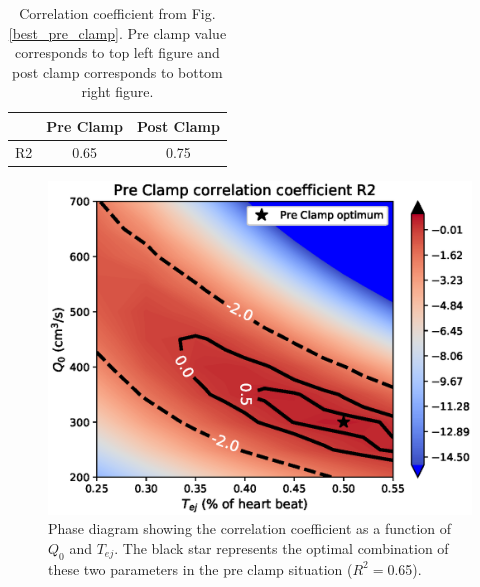 \documentclass{config}
\begin{document}
\begin{table}[H]
\begin{center}
\begin{tabular}{|c|c|c|}
\hline
 & Pre Clamp & Post Clamp  \\
\hline 
R2 & 0.65 & 0.75 \\
\hline 
\end{tabular}
\caption{Correlation coefficient from Fig. \ref{best_pre_clamp}. Pre clamp value corresponds to top left figure and post clamp corresponds to bottom right figure.}
\label{final_results}
\end{center}
\end{table}
\begin{figure}[H]

\centering
\includegraphics[scale=0.7]{Figures/preclamp_phase_diagram_QTej.eps}
\caption{Phase diagram showing the correlation coefficient as a function of $Q_0$ and $T_{ej}$. The black star represents the optimal combination of these two parameters in the pre clamp situation ($R^2 = $0.65).}
\label{PD_preclamp}
\end{figure}
\end{document}
